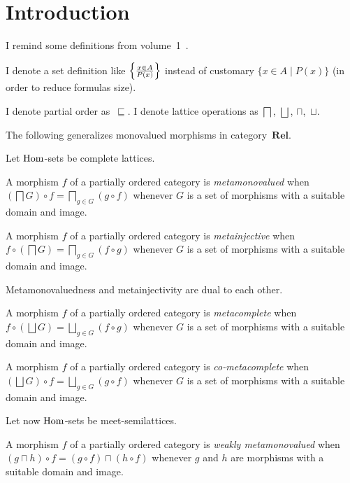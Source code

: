 \chapter{Introduction}

I remind some definitions from volume~1~\cite{volume-1}.

I denote a set definition like $\left\{ \frac{x\in A}{P(x)}\right\}$ instead of customary
$\{ x\in A \mid P(x) \}$ (in order to reduce formulas size).

I denote partial order as~$\sqsubseteq$. I denote lattice operations as
$\bigsqcap$, $\bigsqcup$, $\sqcap$,~$\sqcup$.

The following generalizes monovalued morphisms in category~$\mathbf{Rel}$.

Let $\operatorname{Hom}$-sets be complete lattices.
\begin{defn}
A morphism $f$ of a partially ordered
category is \emph{metamonovalued} when $\left(\bigsqcap G\right)\circ f=\bigsqcap_{g\in G}(g\circ f)$
whenever $G$ is a set of morphisms with a suitable domain and image.
\end{defn}

\begin{defn}
A morphism $f$ of a partially ordered
category is \emph{metainjective} when $f\circ\left(\bigsqcap G\right)=\bigsqcap_{g\in G}(f\circ g)$
whenever $G$ is a set of morphisms with a suitable domain and image.\end{defn}
\begin{obvious}
Metamonovaluedness and metainjectivity are dual to each other.\end{obvious}
\begin{defn}
A morphism $f$ of a partially ordered
category is \emph{metacomplete} when $f\circ\left(\bigsqcup G\right)=\bigsqcup_{g\in G}(f\circ g)$
whenever $G$ is a set of morphisms with a suitable domain and image.
\end{defn}

\begin{defn}
A morphism $f$ of a partially ordered
category is \emph{co-metacomplete} when $\left(\bigsqcup G\right)\circ f=\bigsqcup_{g\in G}(g\circ f)$
whenever $G$ is a set of morphisms with a suitable domain and image.
\end{defn}
Let now $\operatorname{Hom}$-sets be meet-semilattices.
\begin{defn}
A morphism $f$ of a partially
ordered category is \emph{weakly metamonovalued} when $(g\sqcap h)\circ f=(g\circ f)\sqcap(h\circ f)$
whenever $g$ and $h$ are morphisms with a suitable domain and image.
\end{defn}

